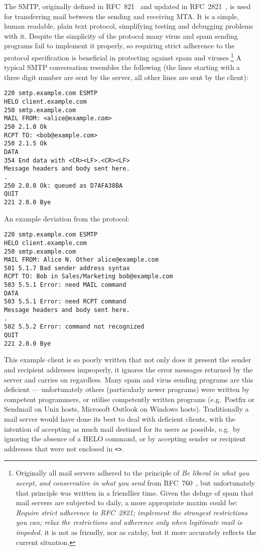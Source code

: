 The \acrlong{SMTP}, originally defined in \gls{RFC}~821~\cite{RFC821} and
updated in \gls{RFC}~2821~\cite{RFC2821}, is used for transferring mail
between the sending and receiving \gls{MTA}\@.  It is a simple, human
readable, plain text protocol, simplifying testing and debugging problems
with it.  Despite the simplicity of the protocol many virus and spam
sending programs fail to implement it properly, so requiring strict
adherence to the protocol specification is beneficial in protecting against
spam and viruses.\footnote{\label{footnote:rfc760}Originally all mail
servers adhered to the principle of \textit{Be liberal in what you accept,
and conservative in what you send\/} from \gls{RFC}~760~\cite{rfc760}, but
unfortunately that principle was written in a friendlier time.  Given the
deluge of spam that mail servers are subjected to daily, a more appropriate
maxim could be: \textit{Require strict adherence to \gls{RFC}~2821;
implement the strongest restrictions you can; relax the restrictions and
adherence only when legitimate mail is impeded.\/}  it is not as friendly,
nor as catchy, but it more accurately reflects the current situation.} A
typical \gls{SMTP} conversation resembles the following (the lines starting
with a three digit number are sent by the server, all other lines are sent
by the client):

\begin{verbatim}
220 smtp.example.com ESMTP
HELO client.example.com
250 smtp.example.com
MAIL FROM: <alice@example.com>
250 2.1.0 Ok
RCPT TO: <bob@example.com>
250 2.1.5 Ok
DATA
354 End data with <CR><LF>.<CR><LF>
Message headers and body sent here.
.
250 2.0.0 Ok: queued as D7AFA38BA
QUIT
221 2.0.0 Bye
\end{verbatim}

An example deviation from the protocol:

\begin{verbatim}
220 smtp.example.com ESMTP
HELO client.example.com
250 smtp.example.com
MAIL FROM: Alice N. Other alice@example.com
501 5.1.7 Bad sender address syntax
RCPT TO: Bob in Sales/Marketing bob@example.com
503 5.5.1 Error: need MAIL command
DATA
503 5.5.1 Error: need RCPT command
Message headers and body sent here.
.
502 5.5.2 Error: command not recognized
QUIT
221 2.0.0 Bye
\end{verbatim}

This example client is so poorly written that not only does it present the
sender and recipient addresses improperly, it ignores the error messages
returned by the server and carries on regardless.  Many spam and virus
sending programs are this deficient --- unfortunately others (particularly
newer programs) were written by competent programmers, or utilise
competently written programs (e.g.\ Postfix or Sendmail on Unix hosts,
Microsoft Outlook on Windows hosts).  Traditionally a mail server would
have done its best to deal with deficient clients, with the intention of
accepting as much mail destined for its users as
possible, e.g.\ by ignoring the absence of a HELO
command, or by accepting sender or recipient addresses that were not
enclosed in \texttt{<>}.  

